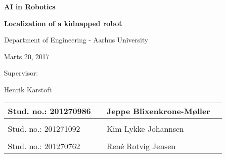 
\centerline{\Huge\bfseries\color{ThemeColor} AI in Robotics}

\vspace{1em}
\centerline{\Large\bfseries\color{BlackColor} Localization of a kidnapped robot}



\vspace{5em}
\centerline{\large\bfseries\color{BlackColor}}
\centerline{\large\color{BlackColor}Department of Engineering - Aarhus University}

\vspace{0.5em}
\centerline{\large\color{BlackColor} Marts 20, 2017}

\vspace{5em}
\centerline{\large\color{BlackColor} Supervisor:}
\vspace{0.5em}
\centerline{\large\color{BlackColor} Henrik Karstoft}

\vspace{25em}

\begin{center}
   \begin{tabular}{ l p{3cm} l l }
   Stud. no.: 201270986 && Jeppe Blixenkrone-Møller & \\\hline
   & & \\
   Stud. no.: 201271092 && Kim Lykke Johannsen & \\\hline
   & & \\
   Stud. no.: 201270762 && René Rotvig Jensen & \\\hline
   \end{tabular}
\end{center}
\thispagestyle{empty} %
\restoregeometry

